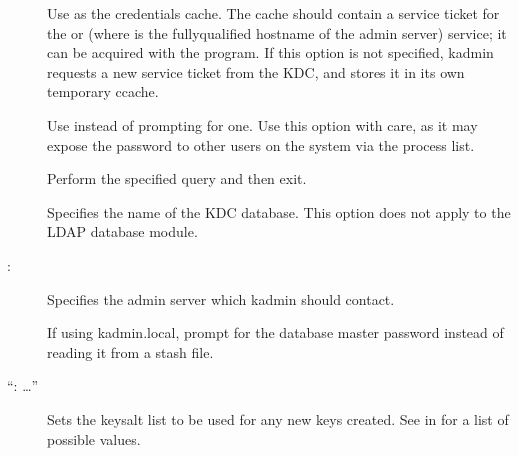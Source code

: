 \documentclass[letterpaper,10pt,english]{sphinxmanual}
\begin{document}
\begin{description}
\item[{ }] \leavevmode
\sphinxAtStartPar
Use  as the credentials cache.  The cache
should contain a service ticket for the  or
 (where  is the fully\sphinxhyphen{}qualified
hostname of the admin server) service; it can be acquired with the
 program.  If this option is not specified, kadmin
requests a new service ticket from the KDC, and stores it in its
own temporary ccache.

\item[{ }] \leavevmode
\sphinxAtStartPar
Use  instead of prompting for one.  Use this option with
care, as it may expose the password to other users on the system
via the process list.

\item[{ }] \leavevmode
\sphinxAtStartPar
Perform the specified query and then exit.

\item[{ }] \leavevmode
\sphinxAtStartPar
Specifies the name of the KDC database.  This option does not
apply to the LDAP database module.

\item[{ \sphinxstyleemphasis{admin\_server}{[}:\sphinxstyleemphasis{port}{]}}] \leavevmode
\sphinxAtStartPar
Specifies the admin server which kadmin should contact.

\item[{}] \leavevmode
\sphinxAtStartPar
If using kadmin.local, prompt for the database master password
instead of reading it from a stash file.

\item[{ “: …”}] \leavevmode
\sphinxAtStartPar
Sets the keysalt list to be used for any new keys created.  See
{\hyperref[\detokenize{admin/conf_files/kdc_conf:keysalt-lists}]{}} in {\hyperref[\detokenize{admin/conf_files/kdc_conf:kdc-conf-5}]{}} for a list of possible
values.


\end{description}
\end{document}
